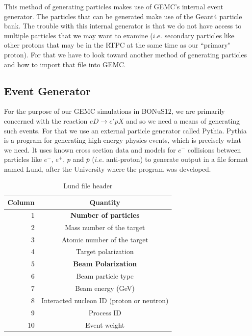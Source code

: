 This method of generating particles makes use of GEMC's internal event generator. The particles that can be generated make use of the Geant4 particle bank. The trouble with this internal generator is that we do not have access to multiple particles that we may want to examine ($i.e.$ secondary particles like other protons that may be in the RTPC at the same time as our ``primary" proton). For that we have to look toward another method of generating particles and how to import that file into GEMC.

\subsection{Event Generator}
For the purpose of our GEMC simulations in BONuS12, we are primarily concerned with the reaction $eD \rightarrow e'pX$ and so we need a means of generating such events. For that we use an external particle generator called Pythia. Pythia is a program for generating high-energy physics events, which is precisely what we need. It uses known cross section data and models for $e^-$ collisions between particles like $e^-$, $e^+$, $p$ and $\bar{p}$ ($i.e.$ anti-proton) to generate output in a file format named Lund, after the University where the program was developed.

\begin{table}[h!]
	\begin{center}
		\caption{Lund file header}
		\label{tab:lund_header}
		\begin{tabular}{r|c} %
			\rowcolor{cyan} \textbf{Column} & \textbf{Quantity} \\
			\hline
			1 & \textbf{Number of particles} \\
			\rowcolor{lightgray} 2 & Mass number of the target \\
			3 & Atomic number of the target \\
			\rowcolor{lightgray} 4 & Target polarization \\
			5 & \textbf{Beam Polarization} \\
			\rowcolor{lightgray} 6 & Beam particle type \\
			7 & Beam energy (GeV) \\
			\rowcolor{lightgray} 8 & Interacted nucleon ID (proton or neutron) \\
			9 & Process ID \\
			\rowcolor{lightgray} 10 & Event weight \\
			\hline
		\end{tabular}
	\end{center}
\end{table}

